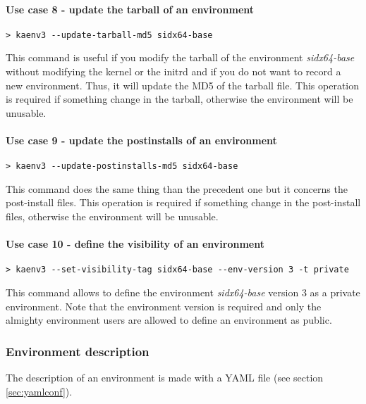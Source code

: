 \documentclass[a4wide,10pt,oneside]{book}
\begin{document}
\paragraph{Use case 8 - update the tarball of an environment}
\begin{verbatim}
> kaenv3 --update-tarball-md5 sidx64-base
\end{verbatim}
This command is useful if you modify the tarball of the environment \textit{sidx64-base} without modifying the kernel or the initrd and if you do not want to record a new environment. Thus, it will update the MD5 of the tarball file. This operation is required if something change in the tarball, otherwise the environment will be unusable.

\paragraph{Use case 9 - update the postinstalls of an environment}
\begin{verbatim}
> kaenv3 --update-postinstalls-md5 sidx64-base
\end{verbatim}
This command does the same thing than the precedent one but it concerns the post-install files. This operation is required if something change in the post-install files, otherwise the environment will be unusable.

\paragraph{Use case 10 - define the visibility of an environment}
\begin{verbatim}
> kaenv3 --set-visibility-tag sidx64-base --env-version 3 -t private
\end{verbatim}
This command allows to define the environment \textit{sidx64-base} version 3 as a private environment. Note that the environment version is required and only the almighty environment users are allowed to define an environment as public.

\subsubsection{Environment description}\label{sec:env_desc}
The description of an environment is made with a YAML file (see section \ref{sec:yamlconf}).
\end{document}
